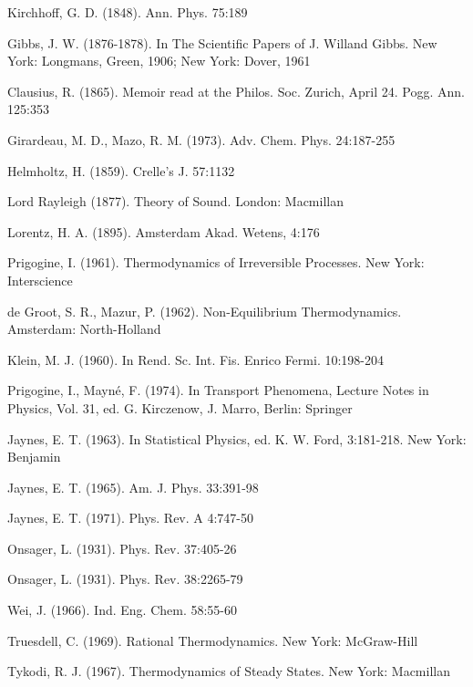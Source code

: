 \documentclass{article}
\begin{document}
\begin{thebibliography}{99}  %

 Kirchhoff, G. D. (1848). Ann. Phys. 75:189

 Gibbs, J. W. (1876-1878). In The Scientific Papers of J. Willand Gibbs. New York: Longmans, Green, 1906; New York: Dover, 1961

 Clausius, R. (1865). Memoir read at the Philos. Soc. Zurich, April 24. Pogg. Ann. 125:353

 Girardeau, M. D., Mazo, R. M. (1973). Adv. Chem. Phys. 24:187-255

 Helmholtz, H. (1859). Crelle's J. 57:1132

 Lord Rayleigh (1877). Theory of Sound. London: Macmillan

 Lorentz, H. A. (1895). Amsterdam Akad. Wetens, 4:176

 Prigogine, I. (1961). Thermodynamics of Irreversible Processes. New York: Interscience

 de Groot, S. R., Mazur, P. (1962). Non-Equilibrium Thermodynamics. Amsterdam: North-Holland

 Klein, M. J. (1960). In Rend. Sc. Int. Fis. Enrico Fermi. 10:198-204

 Prigogine, I., Mayné, F. (1974). In Transport Phenomena, Lecture Notes in Physics, Vol. 31, ed. G. Kirczenow, J. Marro, Berlin: Springer

 Jaynes, E. T. (1963). In Statistical Physics, ed. K. W. Ford, 3:181-218. New York: Benjamin

 Jaynes, E. T. (1965). Am. J. Phys. 33:391-98

 Jaynes, E. T. (1971). Phys. Rev. A 4:747-50

 Onsager, L. (1931). Phys. Rev. 37:405-26

 Onsager, L. (1931). Phys. Rev. 38:2265-79

 Wei, J. (1966). Ind. Eng. Chem. 58:55-60

 Truesdell, C. (1969). Rational Thermodynamics. New York: McGraw-Hill

 Tykodi, R. J. (1967). Thermodynamics of Steady States. New York: Macmillan


\end{thebibliography}
\end{document}
